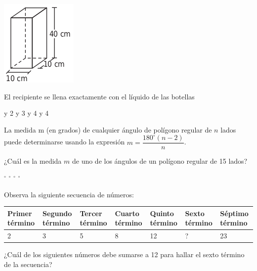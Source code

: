 \documentclass[10pt,letterpaper,addpoints]{exam}
\begin{document}
\begin{questions}
\begin{minipage}{.5\textwidth}
\begin{center}
\includegraphics[scale=.75]{Images/recipiente.png} 
\end{center}
\end{minipage}\hfill
\begin{minipage}{.5\textwidth}
El recipiente se llena exactamente con el líquido de las botellas
\begin{choices}
 y 2
 y 3
 y 4
 y 4
\end{choices}
\end{minipage}
\question La medida m (en grados) de cualquier ángulo de polígono regular de $n$ lados puede determinarse usando la expresión $m=\dfrac{180^{\circ}(n-2)}{n}$.

¿Cuál es la medida $m$ de uno de los ángulos de un polígono regular de 15 lados?

\begin{oneparchoices}
$^{\circ}$
$^{\circ}$
$^{\circ}$
$^{\circ}$
\end{oneparchoices}
\question Observa la siguiente secuencia de números:
\begin{center}
\begin{tabular}{|p{1.5cm}|p{1.5cm}|p{1.5cm}|p{1.5cm}|p{1.5cm}|p{1.5cm}|p{1.5cm}|}
\hline 
\textbf{Primer término} & \textbf{Segundo término} & \textbf{Tercer término} & \textbf{Cuarto término} & \textbf{Quinto término} & \textbf{Sexto término} & \textbf{Séptimo término} \\ 
\hline 
2 & 3 & 5 & 8 & 12 & ? & 23 \\ 
\hline 
\end{tabular} 
\end{center}
¿Cuál de los siguientes números debe sumarse a 12 para hallar el sexto término de la secuencia?

\begin{oneparchoices}
\end{oneparchoices}


\end{questions}
\end{document}
